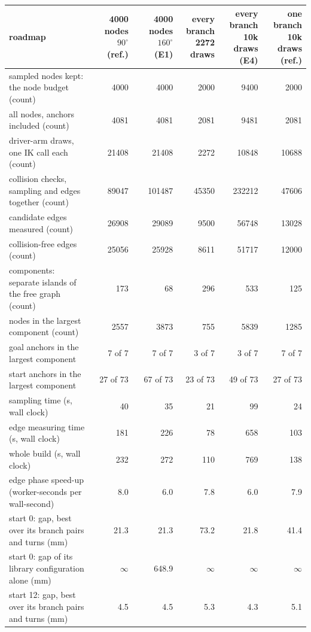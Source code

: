 \begin{tabular}{@{}>{\raggedright\arraybackslash}p{6.2cm} rrrrr@{}}
\toprule
roadmap & \shortstack{4000 nodes\\$90^\circ$ (ref.)} & \shortstack{4000 nodes\\$160^\circ$ (E1)} & \shortstack{every branch\\2272 draws} & \shortstack{every branch\\10k draws (E4)} & \shortstack{one branch\\10k draws (ref.)} \\
\midrule
sampled nodes kept: the node budget (count) & 4000 & 4000 & 2000 & 9400 & 2000 \\
all nodes, anchors included (count) & 4081 & 4081 & 2081 & 9481 & 2081 \\
driver-arm draws, one IK call each (count) & 21408 & 21408 & 2272 & 10848 & 10688 \\
collision checks, sampling and edges together (count) & 89047 & 101487 & 45350 & 232212 & 47606 \\
candidate edges measured (count) & 26908 & 29089 & 9500 & 56748 & 13028 \\
collision-free edges (count) & 25056 & 25928 & 8611 & 51717 & 12000 \\
components: separate islands of the free graph (count) & 173 & 68 & 296 & 533 & 125 \\
nodes in the largest component (count) & 2557 & 3873 & 755 & 5839 & 1285 \\
goal anchors in the largest component & 7 of 7 & 7 of 7 & 3 of 7 & 3 of 7 & 7 of 7 \\
start anchors in the largest component & 27 of 73 & 67 of 73 & 23 of 73 & 49 of 73 & 27 of 73 \\
\midrule
sampling time (s, wall clock) & 40 & 35 & 21 & 99 & 24 \\
edge measuring time (s, wall clock) & 181 & 226 & 78 & 658 & 103 \\
whole build (s, wall clock) & 232 & 272 & 110 & 769 & 138 \\
edge phase speed-up (worker-seconds per wall-second) & 8.0 & 6.0 & 7.8 & 6.0 & 7.9 \\
\midrule
start 0: gap, best over its branch pairs and turns (mm) & 21.3 & 21.3 & 73.2 & 21.8 & 41.4 \\
start 0: gap of its library configuration alone (mm) & $\infty$ & 648.9 & $\infty$ & $\infty$ & $\infty$ \\
start 12: gap, best over its branch pairs and turns (mm) & 4.5 & 4.5 & 5.3 & 4.3 & 5.1 \\

\end{tabular}
